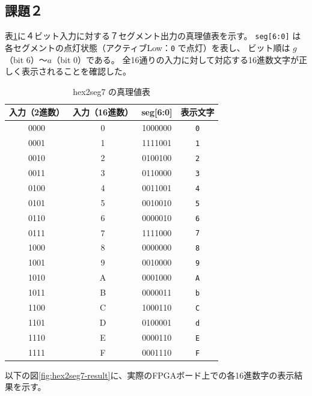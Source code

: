 \documentclass[12pt,a4paper]{ltjsarticle}
\begin{document}
\newpage
\subsection{課題２}

表\ref{tab:hex2seg7}に４ビット入力に対する７セグメント出力の真理値表を示す。
\texttt{seg[6:0]} は各セグメントの点灯状態（アクティブLow：\texttt{0} で点灯）を表し、
ビット順は $g$（bit 6）〜$a$（bit 0）である。
全16通りの入力に対して対応する16進数文字が正しく表示されることを確認した。

\begin{table}[h]
  \centering
  \caption{hex2seg7 の真理値表}
  \label{tab:hex2seg7}
  \begin{tabular}{cc|cc}
    \toprule
    入力（2進数） & 入力（16進数） & seg{[6:0]} & 表示文字 \\
    \midrule
    0000 & 0 & 1000000 & \texttt{0} \\
    0001 & 1 & 1111001 & \texttt{1} \\
    0010 & 2 & 0100100 & \texttt{2} \\
    0011 & 3 & 0110000 & \texttt{3} \\
    0100 & 4 & 0011001 & \texttt{4} \\
    0101 & 5 & 0010010 & \texttt{5} \\
    0110 & 6 & 0000010 & \texttt{6} \\
    0111 & 7 & 1111000 & \texttt{7} \\
    1000 & 8 & 0000000 & \texttt{8} \\
    1001 & 9 & 0010000 & \texttt{9} \\
    1010 & A & 0001000 & \texttt{A} \\
    1011 & B & 0000011 & \texttt{b} \\
    1100 & C & 1000110 & \texttt{C} \\
    1101 & D & 0100001 & \texttt{d} \\
    1110 & E & 0000110 & \texttt{E} \\
    1111 & F & 0001110 & \texttt{F} \\
    \bottomrule
  \end{tabular}
\end{table}

以下の図\ref{fig:hex2seg7-result}に、実際のFPGAボード上での各16進数字の表示結果を示す。
\end{document}
